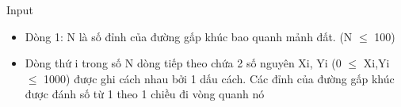 Input
\begin{itemize}
	\item Dòng 1: N là số đỉnh của đường gấp khúc bao quanh mảnh đất. (N $\le$ 100)
	\item Dòng thứ i trong số N dòng tiếp theo chứa 2 số nguyên Xi, Yi (0 $\le$ Xi,Yi $\le$ 1000) được ghi cách nhau bởi 1 dấu cách. Các đỉnh của đường gấp khúc được đánh số từ 1 theo 1 chiều đi vòng quanh nó
\end{itemize}
